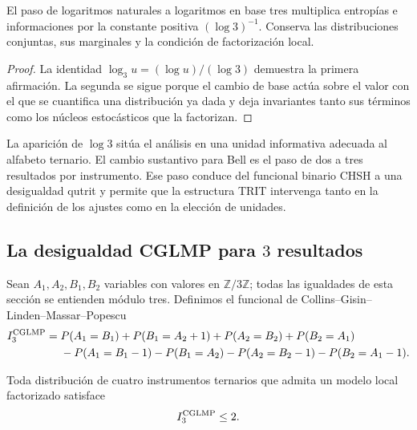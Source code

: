 \begin{proposition}
\label{prop:log3-localidad}
El paso de logaritmos naturales a logaritmos en base tres multiplica entropías e
informaciones por la constante positiva \((\log 3)^{-1}\). Conserva las
distribuciones conjuntas, sus marginales y la condición de factorización local.
\end{proposition}

\begin{proof}
La identidad \(\log_3u=(\log u)/(\log 3)\) demuestra la primera afirmación.
La segunda se sigue porque el cambio de base actúa sobre el valor con el que se
cuantifica una distribución ya dada y deja invariantes tanto sus términos como los
núcleos estocásticos que la factorizan.
\end{proof}

La aparición de \(\log 3\) sitúa el análisis en una unidad informativa adecuada al
alfabeto ternario. El cambio sustantivo para Bell es el paso de dos a tres resultados
por instrumento. Ese paso conduce del funcional binario CHSH a una desigualdad
qutrit y permite que la estructura TRIT intervenga tanto en la definición de los
ajustes como en la elección de unidades.

\subsection{La desigualdad CGLMP para \(3\) resultados}

Sean \(A_1,A_2,B_1,B_2\) variables con valores en
\(\mathbb Z/3\mathbb Z\); todas las igualdades de esta sección se entienden
módulo tres. Definimos el funcional de
Collins--Gisin--Linden--Massar--Popescu \cite{CGLMP2002}
\begin{align}
 I_3^{\rm CGLMP}={}&P(A_1=B_1)+P(B_1=A_2+1)
 +P(A_2=B_2)+P(B_2=A_1)\notag\\
 &-P(A_1=B_1-1)-P(B_1=A_2)
 -P(A_2=B_2-1)-P(B_2=A_1-1).
 \label{eq:cglmp-tres}
\end{align}

\begin{theorem}
\label{thm:cglmp-local}
Toda distribución de cuatro instrumentos ternarios que admita un modelo local
factorizado satisface
\[
 I_3^{\rm CGLMP}\leq2.
\]
\end{theorem}

